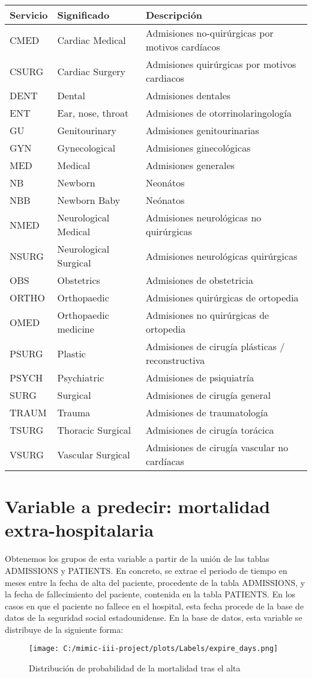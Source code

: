 \documentclass{report}
\begin{document}
\begin{longtable}[]{@{}lll@{}}

\toprule
Servicio & Significado & Descripción\tabularnewline
\midrule
\endhead
CMED & Cardiac Medical & Admisiones no-quirúrgicas por motivos
cardíacos\tabularnewline
CSURG & Cardiac Surgery & Admisiones quirúrgicas por motivos
cardiacos\tabularnewline
DENT & Dental & Admisiones dentales\tabularnewline
ENT & Ear, nose, throat & Admisiones de
otorrinolaringología\tabularnewline
GU & Genitourinary & Admisiones genitourinarias\tabularnewline
GYN & Gynecological & Admisiones ginecológicas\tabularnewline
MED & Medical & Admisiones generales\tabularnewline
NB & Newborn & Neonátos\tabularnewline
NBB & Newborn Baby & Neónatos\tabularnewline
NMED & Neurological Medical & Admisiones neurológicas no
quirúrgicas\tabularnewline
NSURG & Neurological Surgical & Admisiones neurológicas
quirúrgicas\tabularnewline
OBS & Obstetrics & Admisiones de obstetricia\tabularnewline
ORTHO & Orthopaedic & Admisiones quirúrgicas de ortopedia\tabularnewline
OMED & Orthopaedic medicine & Admisiones no quirúrgicas de
ortopedia\tabularnewline
PSURG & Plastic & Admisiones de cirugía plásticas /
reconstructiva\tabularnewline
PSYCH & Psychiatric & Admisiones de psiquiatría\tabularnewline
SURG & Surgical & Admisiones de cirugía general\tabularnewline
TRAUM & Trauma & Admisiones de traumatología\tabularnewline
TSURG & Thoracic Surgical & Admisiones de cirugía
torácica\tabularnewline
VSURG & Vascular Surgical & Admisiones de cirugía vascular no
cardíacas\tabularnewline

\bottomrule
\end{longtable}
\newpage

\section{Variable a predecir: mortalidad extra-hospitalaria}

Obtenemos los grupos de esta variable a partir de la unión de las tablas ADMISSIONS y PATIENTS. En concreto, se extrae el periodo de tiempo en meses entre la fecha de alta del paciente, procedente de la tabla ADMISSIONS, y la fecha de fallecimiento del paciente, contenida en la tabla PATIENTS. En los casos en que el paciente no fallece en el hospital, esta fecha procede de la base de datos de la seguridad social estadounidense. En la base de datos, esta variable se distribuye de la siguiente forma:

\begin{figure}[h]
\centering
\texttt{[image: C:/mimic-iii-project/plots/Labels/expire\_days.png]}
\caption{Distribución de probabilidad de la mortalidad tras el alta}
\end{figure}
\end{document}
